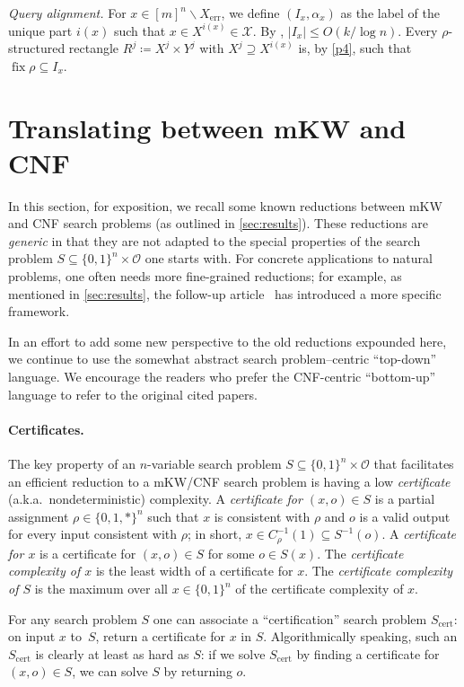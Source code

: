 \documentclass{toc}
\DeclareMathOperator{\fix}{fix}
\DeclareMathOperator{\err}{err}
\DeclareMathOperator{\cert}{cert}
\newcommand{\calO}{\mathcal{O}}
\newcommand{\calX}{\mathcal{X}}
\newcommand{\allX}{[m]^n}
\begin{document}
\medskip
\noindent \emph{Query alignment.}
For $x \in \allX \smallsetminus X_{\err}$, we define $(I_x,\alpha_x)$ as the label of the unique part $i(x)$ such that $x\in X^{i(x)} \in\calX$. By , $|I_x|\leq O(k/\log n)$. Every $\rho$-structured rectangle $R^j\coloneqq X^j\times Y^j$ with $X^j\supseteq X^{i(x)}$ is, by \ref{p4}, such that $\fix\rho\subseteq I_x$.


%
\section{Translating between mKW and CNF} \label{sec:apps}  %

In this section, for exposition, we recall some known reductions between mKW and CNF search problems (as outlined in \autoref{sec:results}). These reductions are \emph{generic} in that they are not adapted to the special properties of the search problem $S\subseteq\{0,1\}^n\times\calO$ one starts with. For concrete applications to natural problems, one often needs more fine-grained reductions; for example, as mentioned in \autoref{sec:results}, the follow-up
%
article~\cite{goos19monotone}   %
has introduced a more specific framework.

In an effort to add some new perspective to the old reductions expounded here, we continue to use the somewhat abstract search problem--centric ``top-down'' language. We encourage the readers who prefer the CNF-centric ``bottom-up'' language to refer to the original cited papers.

\paragraph{Certificates.}
The key property of an $n$-variable search problem $S\subseteq \{0,1\}^n\times\calO$ that facilitates an efficient reduction to a mKW/CNF search problem is having a low \emph{certificate} (a.k.a.\ nondeterministic) complexity. A \emph{certificate for $(x,o) \in S$} is a partial assignment $\rho\in\{0,1,*\}^n$ such that $x$ is consistent with $\rho$ and $o$ is a valid output for every input consistent with $\rho$; in short, $x\in C_\rho^{-1}(1)\subseteq S^{-1}(o)$. A \emph{certificate for $x$} is a certificate for $(x,o)\in S$ for some $o\in S(x)$. The \emph{certificate complexity of $x$} is the least width of a certificate for $x$. The \emph{certificate complexity of $S$} is the maximum over all $x\in\{0,1\}^n$ of the certificate complexity of $x$.

For any search problem $S$ one can associate a ``certification'' search problem $S_{\cert}$: on input $x$ to~$S$,
return %
a certificate for $x$ in $S$. Algorithmically speaking, such an $S_{\cert}$ is clearly at least as hard as $S$: if we solve $S_{\cert}$ by finding a certificate for $(x,o)\in S$, we can solve $S$ by
returning %
$o$.
\end{document}

